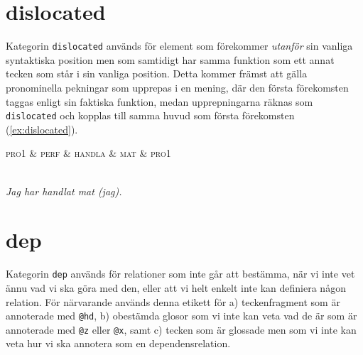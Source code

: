 \documentclass[11pt,a4paper]{article}
\begin{document}
\section{dislocated}
Kategorin \texttt{dislocated} används för element som förekommer \textit{utanför} sin vanliga syntaktiska position men som samtidigt har samma funktion som ett annat tecken som står i sin vanliga position. Detta kommer främst att gälla pronominella pekningar som upprepas i en mening, där den första förekomsten taggas enligt sin faktiska funktion, medan upprepningarna räknas som \texttt{dislocated} och kopplas till samma huvud som första förekomsten (\ref{ex:dislocated}).

\begin{example}
\label{ex:dislocated}
\begin{dependency}[theme = simple]
   \begin{deptext}[column sep=1em]
      \textsc{pro1} \& \textsc{perf} \& \textsc{handla} \& \textsc{mat} \& \textsc{pro1} \\
   \end{deptext}
\end{dependency}
\\
\textit{Jag har handlat mat (jag).}
\end{example}

\section{dep}
Kategorin \texttt{dep} används för relationer som inte går att bestämma, när vi inte vet ännu vad vi ska göra med den, eller att vi helt enkelt inte kan definiera någon relation. För närvarande används denna etikett för a) teckenfragment som är annoterade med \texttt{@hd}, b) obestämda glosor som vi inte kan veta vad de är som är annoterade med \texttt{@z} eller \texttt{@x}, samt c) tecken som är glossade men som vi inte kan veta hur vi ska annotera som en dependensrelation.












\end{document}
